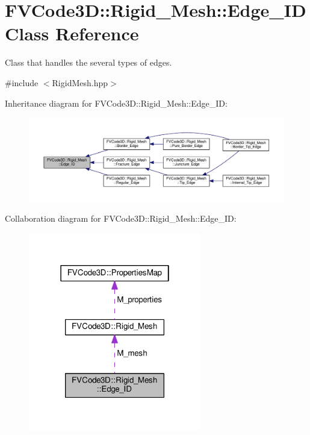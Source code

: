 \hypertarget{classFVCode3D_1_1Rigid__Mesh_1_1Edge__ID}{}\section{F\+V\+Code3D\+:\+:Rigid\+\_\+\+Mesh\+:\+:Edge\+\_\+\+ID Class Reference}
\label{classFVCode3D_1_1Rigid__Mesh_1_1Edge__ID}


Class that handles the several types of edges.  




{\ttfamily \#include $<$Rigid\+Mesh.\+hpp$>$}



Inheritance diagram for F\+V\+Code3D\+:\+:Rigid\+\_\+\+Mesh\+:\+:Edge\+\_\+\+ID\+:
\nopagebreak
\begin{figure}[H]
\begin{center}
\leavevmode
\includegraphics[width=350pt]{classFVCode3D_1_1Rigid__Mesh_1_1Edge__ID__inherit__graph}
\end{center}
\end{figure}


Collaboration diagram for F\+V\+Code3D\+:\+:Rigid\+\_\+\+Mesh\+:\+:Edge\+\_\+\+ID\+:
\nopagebreak
\begin{figure}[H]
\begin{center}
\leavevmode
\includegraphics[width=214pt]{classFVCode3D_1_1Rigid__Mesh_1_1Edge__ID__coll__graph}
\end{center}
\end{figure}
